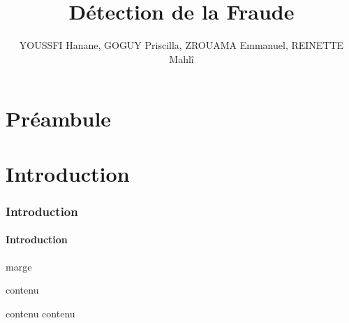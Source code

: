 \documentclass[titlepage,10pt,a4paper]{article}
\title{Détection de la Fraude}
\author{YOUSSFI Hanane, GOGUY Priscilla, ZROUAMA Emmanuel, REINETTE Mahlî}
\date{}
\begin{document}
\pagecolor{black!20}
\maketitle

\tableofcontents
\part{Préambule}
\part{Introduction}
\section{Introduction}
\subsection{Introduction}







\begin{center}
\begin{minipage}[r]{0.1\textwidth}
\phantom{aaaaaaa} marge
\end{minipage}
\begin{minipage}[r]{0.8\textwidth}

\phantom{aaaaaaa} contenu

\end{minipage}
\end{center}


\begin{tcolorbox}[enhanced,title=vide,attach boxed title to top left=
{xshift=-2mm,yshift=-2mm},colback=black!24,rightrule=1mm]
contenu
\tcblower
contenu

\end{tcolorbox}
\end{document}
